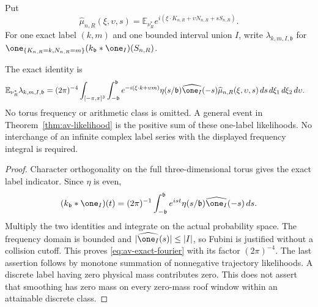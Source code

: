 Put
\[
 \widehat\mu_{n,R}(\xi,\upsilon,s)=
 \mathbb E_{\nu_R^*}
 e^{i(\xi\cdot K_{n,R}+\upsilon N_{n,R}+sS_{n,R})}.
\]
For one exact label $(k,m)$ and one bounded interval union $I$, write
$\lambda_{k,m,I,\mathfrak b}$ for
$\one_{\{K_{n,R}=k,N_{n,R}=m\}}
 (k_{\mathfrak b}*\one_I)(S_{n,R})$.
\begin{corollary}
\label{cor:av-exact-fourier}
The exact identity is
\begin{align}
 \mathbb E_{\nu_R^*}\lambda_{k,m,I,\mathfrak b}
  ={}&(2\pi)^{-4}\int_{[-\pi,\pi]^3}\int_{-\mathfrak b}^{\mathfrak b}
      e^{-i(\xi\cdot k+\upsilon m)}
      \eta(s/\mathfrak b)\widehat{\one_I}(-s)
      \widehat\mu_{n,R}(\xi,\upsilon,s)
                           \,ds\,d\xi_1\,d\xi_2\,d\upsilon.
                                                       \label{eq:av-exact-fourier}
\end{align}
No torus frequency or arithmetic class is omitted.  A general event
in Theorem~\ref{thm:av-likelihood} is the positive sum of these
one-label likelihoods.  No interchange of an infinite complex label
series with the displayed frequency integral is required.
\end{corollary}
\begin{proof}
Character orthogonality on the full three-dimensional torus gives
the exact label indicator.  Since $\eta$ is even,
\[
 (k_{\mathfrak b}*\one_I)(t)
 =(2\pi)^{-1}\int_{-\mathfrak b}^{\mathfrak b}
       e^{ist}\eta(s/\mathfrak b)\widehat{\one_I}(-s)\,ds.
\]
Multiply the two identities and integrate on the actual probability
space.  The frequency domain is bounded and
$|\widehat{\one_I}(s)|\le|I|$, so Fubini is justified without a
collision cutoff.  This proves \eqref{eq:av-exact-fourier} with its
factor $(2\pi)^{-4}$.  The last assertion follows by monotone
summation of nonnegative trajectory likelihoods.  A discrete label
having zero physical mass contributes zero.  This does not assert
that smoothing has zero mass on every zero-mass roof window within
an attainable discrete class.
\end{proof}

